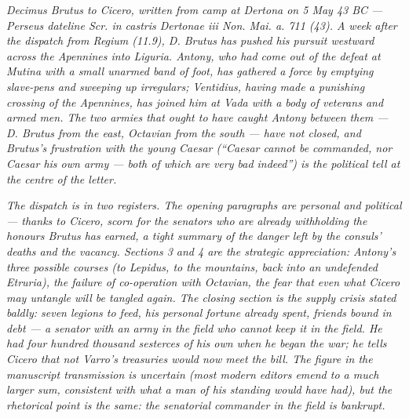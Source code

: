 
\textit{Decimus Brutus to Cicero, written from camp at Dertona on 5 May 43 BC --- Perseus dateline \textit{Scr. in castris Dertonae iii Non. Mai. a. 711 (43)}. A week after the dispatch from Regium (11.9), D. Brutus has pushed his pursuit westward across the Apennines into Liguria. Antony, who had come out of the defeat at Mutina with a small unarmed band of foot, has gathered a force by emptying slave-pens and sweeping up irregulars; Ventidius, having made a punishing crossing of the Apennines, has joined him at Vada with a body of veterans and armed men. The two armies that ought to have caught Antony between them --- D. Brutus from the east, Octavian from the south --- have not closed, and Brutus's frustration with the young Caesar (``Caesar cannot be commanded, nor Caesar his own army --- both of which are very bad indeed'') is the political tell at the centre of the letter.}

\textit{The dispatch is in two registers. The opening paragraphs are personal and political --- thanks to Cicero, scorn for the senators who are already withholding the honours Brutus has earned, a tight summary of the danger left by the consuls' deaths and the vacancy. Sections 3 and 4 are the strategic appreciation: Antony's three possible courses (to Lepidus, to the mountains, back into an undefended Etruria), the failure of co-operation with Octavian, the fear that even what Cicero may untangle will be tangled again. The closing section is the supply crisis stated baldly: seven legions to feed, his personal fortune already spent, friends bound in debt --- a senator with an army in the field who cannot keep it in the field. He had four hundred thousand sesterces of his own when he began the war; he tells Cicero that not Varro's treasuries would now meet the bill. The figure in the manuscript transmission is uncertain (most modern editors emend to a much larger sum, consistent with what a man of his standing would have had), but the rhetorical point is the same: the senatorial commander in the field is bankrupt.}
